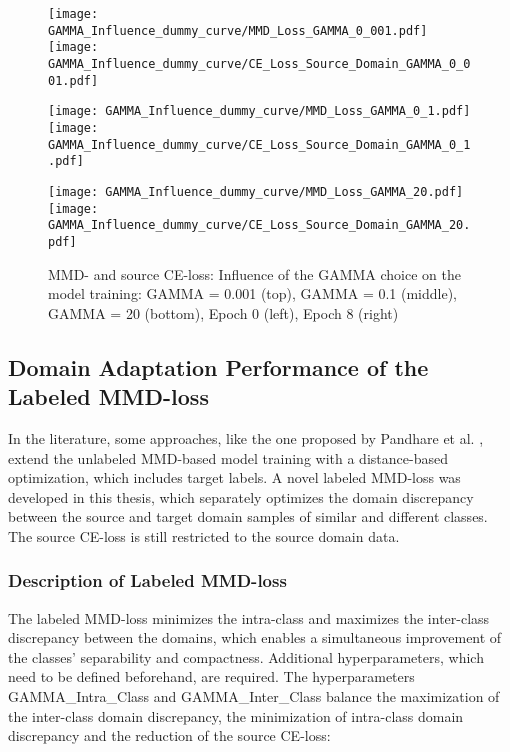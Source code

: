 \begin{figure}[H]
  \centering
  \texttt{[image: GAMMA\_Influence\_dummy\_curve/MMD\_Loss\_GAMMA\_0\_001.pdf]}
  \hspace{.3cm}
  \texttt{[image: GAMMA\_Influence\_dummy\_curve/CE\_Loss\_Source\_Domain\_GAMMA\_0\_001.pdf]}

  \vspace{.1cm}

  \texttt{[image: GAMMA\_Influence\_dummy\_curve/MMD\_Loss\_GAMMA\_0\_1.pdf]}
  \hspace{.3cm}
  \texttt{[image: GAMMA\_Influence\_dummy\_curve/CE\_Loss\_Source\_Domain\_GAMMA\_0\_1.pdf]}

  \vspace{.1cm}

  \texttt{[image: GAMMA\_Influence\_dummy\_curve/MMD\_Loss\_GAMMA\_20.pdf]}
  \hspace{.1cm}
  \texttt{[image: GAMMA\_Influence\_dummy\_curve/CE\_Loss\_Source\_Domain\_GAMMA\_20.pdf]}

  \caption{MMD- and source CE-loss: Influence of the GAMMA choice on the model training: GAMMA = 0.001 (top), GAMMA = 0.1 (middle), GAMMA = 20 (bottom), Epoch 0 (left), Epoch 8 (right)}
  \label{fig:learning_curves_influence_mmd_feature_extractor}
\end{figure}

\subsection{Domain Adaptation Performance of the Labeled MMD-loss} \label{sec:Differences of labeled and unlabeled MMD loss}

In the literature, some approaches, like the one proposed by Pandhare et al. \cite{Pandhare2021}, extend the unlabeled MMD-based model training with a distance-based optimization, which includes target labels. A novel labeled MMD-loss was developed in this thesis, which separately optimizes the domain discrepancy between the source and target domain samples of similar and different classes. The source CE-loss is still restricted to the source domain data.
\subsubsection{Description of Labeled MMD-loss}
The labeled MMD-loss minimizes the intra-class and maximizes the inter-class discrepancy between the domains, which enables a simultaneous improvement of the classes' separability and compactness. Additional hyperparameters, which need to be defined beforehand, are required. The hyperparameters GAMMA\_Intra\_Class and GAMMA\_Inter\_Class balance the maximization of the inter-class domain discrepancy, the minimization of intra-class domain discrepancy and the reduction of the source CE-loss:

